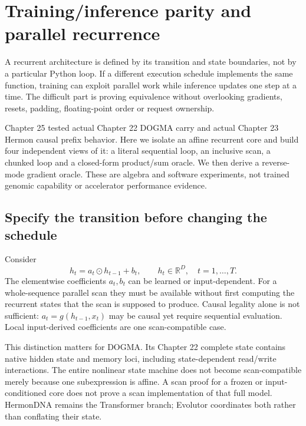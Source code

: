 \chapter{Training/inference parity and parallel recurrence}
\label{evod26:chapter}
A recurrent architecture is defined by its transition and state boundaries, not by
a particular Python loop. If a different execution schedule implements the same
function, training can exploit parallel work while inference updates one step at
a time. The difficult part is proving equivalence without overlooking gradients,
resets, padding, floating-point order or request ownership.

Chapter 25 tested actual Chapter 22 DOGMA carry and actual Chapter 23 Hermon causal
prefix behavior. Here we isolate an affine recurrent core and build four independent
views of it: a literal sequential loop, an inclusive scan, a chunked loop and a
closed-form product/sum oracle. We then derive a reverse-mode gradient oracle.
These are algebra and software experiments, not trained genomic capability or
accelerator performance evidence.

\section{Specify the transition before changing the schedule}
Consider
\begin{equation}
h_t=a_t\odot h_{t-1}+b_t,\qquad h_t\in\mathbb R^D,\quad t=1,\ldots,T.
\label{evod26:rec}
\end{equation}
The elementwise coefficients $a_t,b_t$ can be learned or input-dependent.
For a whole-sequence parallel scan they must be available without first computing
the recurrent states that the scan is supposed to produce. Causal legality alone
is not sufficient: $a_t=g(h_{t-1},x_t)$ may be causal yet require sequential
evaluation. Local input-derived coefficients are one scan-compatible case.

This distinction matters for DOGMA. Its Chapter 22 complete state contains native
hidden state and memory loci, including state-dependent read/write interactions.
The entire nonlinear state machine does not become scan-compatible merely because
one subexpression is affine. A scan proof for a frozen or input-conditioned core
does not prove a scan implementation of that full model. HermonDNA remains the
Transformer branch; Evolutor coordinates both rather than conflating their state.

